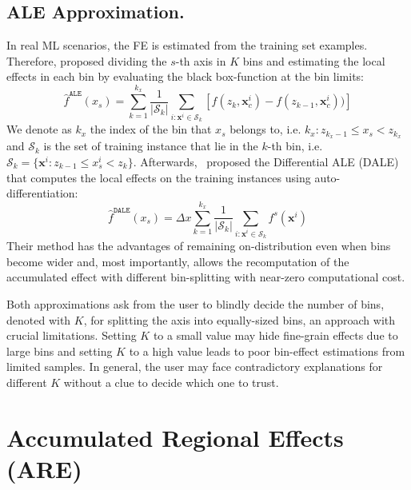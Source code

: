 \documentclass[twoside]{article}
\newcommand{\xc}{\mathbf{x}_c}
\newcommand{\xb}{\mathbf{x}}
\begin{document}
\subsection{ALE Approximation.}
\label{sec:ale-approximation}

In real ML scenarios, the FE is estimated from the training set
examples. Therefore, \citep{apley2020visualizing} proposed dividing
the \(s\)-th axis in \(K\) bins and estimating the local effects in
each bin by evaluating the black box-function at the bin limits:
\begin{equation}
  \label{eq:ALE_accumulated_mean_est}
  \hat{f}^{\mathtt{ALE}}(x_s) = \sum_{k=1}^{k_x} \frac{1}{|\mathcal{S}_k|} \sum_{i:\mathbf{x}^i \in
    \mathcal{S}_k} \left [ f(z_{k}, \xc^i) - f(z_{k-1}, \xc^i)) \right ]
\end{equation}
We denote as \(k_x\) the index of the bin that \(x_s\) belongs to,
i.e. \(k_x: z_{k_x-1} \leq x_s < z_{k_x} \) and \(\mathcal{S}_k\) is
the set of training instance that lie in the \(k\)-th bin, i.e.
\( \mathcal{S}_k = \{ \xb^i : z_{k-1} \leq x^i_s < z_{k} \}
\). Afterwards,~\citep{gkolemis22} proposed the Differential ALE
(DALE) that computes the local effects on the training instances using
auto-differentiation:
\begin{equation}
  \label{eq:DALE_accumulated_mean_est}
  \hat{f}^{\mathtt{DALE}}(x_s) = \Delta x \sum_{k=1}^{k_x} \frac{1}{|\mathcal{S}_k|} \sum_{i:\mathbf{x}^i \in
    \mathcal{S}_k} f^s(\mathbf{x}^i)
\end{equation}
%
Their method has the advantages of remaining on-distribution even when
bins become wider and, most importantly, allows the recomputation of
the accumulated effect with different bin-splitting with near-zero
computational cost.

Both approximations ask from the user to blindly decide the number of
bins, denoted with \(K\), for splitting the axis into equally-sized
bins, an approach with crucial limitations. Setting \(K\) to a small
value may hide fine-grain effects due to large bins and setting \(K\)
to a high value leads to poor bin-effect estimations from limited
samples. In general, the user may face contradictory explanations for
different \(K\) without a clue to decide which one to trust.

\section{Accumulated Regional Effects (ARE)}
\label{sec:NAME-method}
\end{document}
